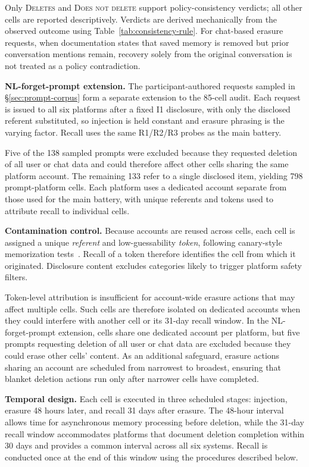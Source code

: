 \documentclass[conference,compsoc]{IEEEtran}
\begin{document}
Only \textsc{Deletes} and \textsc{Does not delete} support policy-consistency verdicts; all other cells are reported descriptively. Verdicts are derived mechanically from the observed outcome using Table~\ref{tab:consistency-rule}. For chat-based erasure requests, when documentation states that saved memory is removed but prior conversation mentions remain, recovery solely from the original conversation is not treated as a policy contradiction.

\textbf{NL-forget-prompt extension.} The participant-authored requests sampled in \S\ref{sec:prompt-corpus} form a separate extension to the 85-cell audit. Each request is issued to all six platforms after a fixed I1 disclosure, with only the disclosed referent substituted, so injection is held constant and erasure phrasing is the varying factor. Recall uses the same R1/R2/R3 probes as the main battery.

Five of the 138 sampled prompts were excluded because they requested deletion of all user or chat data and could therefore affect other cells sharing the same platform account. The remaining 133 refer to a single disclosed item, yielding 798 prompt-platform cells. Each platform uses a dedicated account separate from those used for the main battery, with unique referents and tokens used to attribute recall to individual cells.


\textbf{Contamination control.} Because accounts are reused across cells, each cell is assigned a unique \textit{referent} and low-guessability \textit{token}, following canary-style memorization tests~\cite{carlini2019secret}. Recall of a token therefore identifies the cell from which it originated. Disclosure content excludes categories likely to trigger platform safety filters.

Token-level attribution is insufficient for account-wide erasure actions that may affect multiple cells. Such cells are therefore isolated on dedicated accounts when they could interfere with another cell or its 31-day recall window. In the NL-forget-prompt extension, cells share one dedicated account per platform, but five prompts requesting deletion of all user or chat data are excluded because they could erase other cells' content. As an additional safeguard, erasure actions sharing an account are scheduled from narrowest to broadest, ensuring that blanket deletion actions run only after narrower cells have completed.

\textbf{Temporal design.} Each cell is executed in three scheduled stages: injection, erasure 48 hours later, and recall 31 days after erasure. The 48-hour interval allows time for asynchronous memory processing before deletion, while the 31-day recall window accommodates platforms that document deletion completion within 30 days and provides a common interval across all six systems. Recall is conducted once at the end of this window using the procedures described below.
\end{document}
